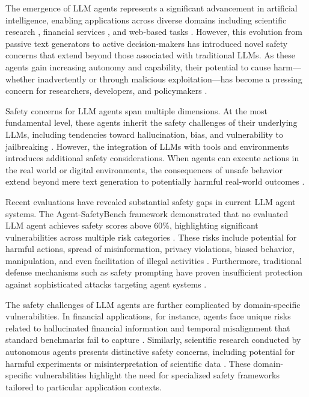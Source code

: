 \documentclass[conference]{IEEEtran}
\begin{document}
The emergence of LLM agents represents a significant advancement in artificial intelligence, enabling applications across diverse domains including scientific research \cite{2402.04247}, financial services \cite{2502.15865}, and web-based tasks \cite{2503.04957}. However, this evolution from passive text generators to active decision-makers has introduced novel safety concerns that extend beyond those associated with traditional LLMs. As these agents gain increasing autonomy and capability, their potential to cause harm—whether inadvertently or through malicious exploitation—has become a pressing concern for researchers, developers, and policymakers \cite{2401.10019}.

Safety concerns for LLM agents span multiple dimensions. At the most fundamental level, these agents inherit the safety challenges of their underlying LLMs, including tendencies toward hallucination, bias, and vulnerability to jailbreaking \cite{2412.17686}. However, the integration of LLMs with tools and environments introduces additional safety considerations. When agents can execute actions in the real world or digital environments, the consequences of unsafe behavior extend beyond mere text generation to potentially harmful real-world outcomes \cite{2502.15086}.

Recent evaluations have revealed substantial safety gaps in current LLM agent systems. The Agent-SafetyBench framework demonstrated that no evaluated LLM agent achieves safety scores above 60\%, highlighting significant vulnerabilities across multiple risk categories \cite{2412.14470}. These risks include potential for harmful actions, spread of misinformation, privacy violations, biased behavior, manipulation, and even facilitation of illegal activities \cite{2308.12833}. Furthermore, traditional defense mechanisms such as safety prompting have proven insufficient protection against sophisticated attacks targeting agent systems \cite{2402.10196}.

The safety challenges of LLM agents are further complicated by domain-specific vulnerabilities. In financial applications, for instance, agents face unique risks related to hallucinated financial information and temporal misalignment that standard benchmarks fail to capture \cite{2502.15865}. Similarly, scientific research conducted by autonomous agents presents distinctive safety concerns, including potential for harmful experiments or misinterpretation of scientific data \cite{2402.04247}. These domain-specific vulnerabilities highlight the need for specialized safety frameworks tailored to particular application contexts.
\end{document}
